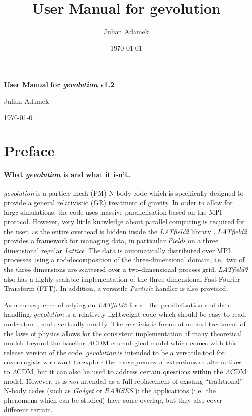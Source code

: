 \documentclass[a4paper,10pt]{article}
\title{User Manual for gevolution}
\author{Julian Adamek}
\date{\today}
\begin{document}
\centerline{\textbf{\huge User Manual for \textit{gevolution} v1.2}}
\vspace{1cm}
\centerline{\large Julian Adamek}
\medskip
\centerline{\today}

\tableofcontents

\section{Preface}

\paragraph{What \textit{gevolution} is and what it isn't.} \textit{gevolution} is a particle-mesh (PM) N-body code which is
specifically designed to provide a general relativistic (GR) treatment of gravity. In order to allow for large simulations, the code uses
massive parallelisation based on the MPI protocol. However, very little knowledge about parallel computing is required for the user, as the
entire overhead is hidden inside the \textit{LATfield2} library \cite{David:2015eya}. \textit{LATfield2} provides a framework for managing
data, in particular
\textit{Fields} on a three dimensional regular \textit{Lattice}. The data is automatically distributed over MPI processes using a
rod-decomposition of the three-dimensional domain, i.e.\ two of the three dimensions are scattered over a two-dimensional process grid.
\textit{LATfield2} also has a highly scalable implementation of the three-dimensional Fast Fourier Transform (FFT). In addition, a
versatile \textit{Particle} handler is also provided.

As a consequence of relying on \textit{LATfield2} for all the parallelisation and data handling, \textit{gevolution} is a relatively
lightweight code which should be easy to read, understand, and eventually modify. The relativistic formulation and treatment of the laws
of physics allows for the consistent implementation of many theoretical models beyond the baseline $\mathsf{\Lambda}$CDM cosmological
model which comes with this release version of the code. \textit{gevolution} is intended to be a versatile tool for cosmologists who want
to explore the consequences of extensions or alternatives to $\mathsf{\Lambda}$CDM, but it can also be used to address certain questions
within the $\mathsf{\Lambda}$CDM model. However, it is \textit{not} intended as a full replacement of existing ``traditional'' N-body codes
(such as \textit{Gadget} \cite{Springel:2000yr,Springel:2005mi} or \textit{RAMSES} \cite{Teyssier:2001cp}): the applications (i.e.\ the
phenomena which can be studied) have some overlap, but they also cover different terrain.
\end{document}
